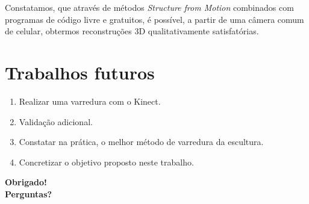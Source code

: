 \documentclass[table, usenames, svgnames, xcolor=dvipsnames]{beamer}
\begin{document}
\begin{frame}
	\begin{center}
	Constatamos, que através de métodos \emph{Structure from Motion} combinados com programas de código livre e gratuitos, é possível, a partir de uma câmera comum de celular, obtermos reconstruções 3D qualitativamente satisfatórias.
	\end{center}
\end{frame}

\section{Trabalhos futuros}

\begin{frame}
	\begin{enumerate}
    	\item {Realizar uma varredura com o Kinect.}
 \item {Validação adicional.} 
\item {Constatar na prática, o melhor método de varredura da escultura.} 
\item {Concretizar o objetivo proposto neste trabalho.}
	\end{enumerate}
\end{frame}

{%
\begin{frame}[plain]
\begin{center}
{\huge \bf Obrigado! \\
Perguntas?}
\end{center}
	
\end{frame}
}
\end{document}
